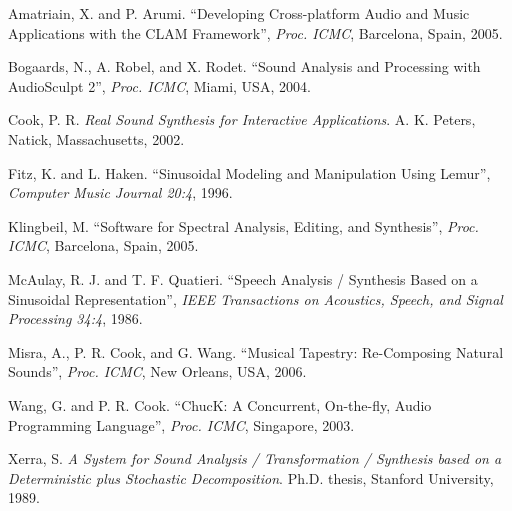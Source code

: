 \documentclass{article}
\begin{document}
\begin{thebibliography}{citations}

 Amatriain, X. and P. Arumi. ``Developing Cross-platform Audio and Music 
Applications with the CLAM Framework'', {\it Proc. ICMC}, Barcelona, Spain, 2005. 

 Bogaards, N., A. Robel, and X. Rodet. ``Sound Analysis and Processing 
with AudioSculpt 2'', {\it Proc. ICMC}, Miami, USA, 2004. 

 Cook, P. R. {\it Real Sound Synthesis for Interactive
Applications}. A. K. Peters, Natick, Massachusetts, 2002.

 Fitz, K. and L. Haken. ``Sinusoidal Modeling and Manipulation Using Lemur'', 
{\it Computer Music Journal 20:4}, 1996. 

 Klingbeil, M. ``Software for Spectral Analysis, Editing, 
and Synthesis'', {\it Proc. ICMC}, 
Barcelona, Spain, 2005. 

 McAulay, R. J. and T. F. Quatieri. ``Speech Analysis / Synthesis Based on a 
Sinusoidal Representation'', {\it IEEE Transactions on Acoustics, Speech, and Signal Processing 34:4}, 1986.

 Misra, A., P. R. Cook, and G. Wang. ``Musical
Tapestry: Re-Composing Natural Sounds'', {\it Proc. ICMC}, New Orleans, USA, 2006.


 Wang, G. and P. R. Cook. ``ChucK: A Concurrent, On-the-fly, Audio Programming 
Language'', {\it Proc. ICMC}, Singapore, 2003.

 Xerra, S. {\it A System for Sound Analysis / Transformation / Synthesis based on a 
Deterministic plus Stochastic Decomposition}. Ph.D. thesis, Stanford University, 1989. 


\end{thebibliography}
\end{document}
